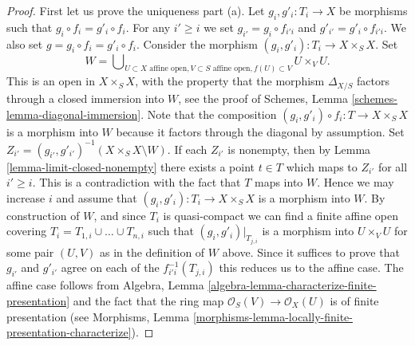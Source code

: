 \documentclass{stacks-project}
\theoremstyle{plain}
\theoremstyle{definition}
\theoremstyle{remark}
\numberwithin{equation}{subsection}
\begin{document}
\begin{proof}
\noindent
First let us prove the uniqueness part (a). Let $g_i, g'_i : T_i \to X$ be
morphisms such that $g_i \circ f_i = g'_i \circ f_i$. For any $i' \geq i$
we set $g_{i'} = g_i \circ f_{i'i}$ and $g'_{i'} = g'_i \circ f_{i'i}$.
We also set $g = g_i \circ f_i = g'_i \circ f_i$.
Consider the morphism
$(g_i, g'_i) : T_i \to X \times_S X$. Set
$$
W =
\bigcup\nolimits_{U \subset X\text{ affine open},
V \subset S\text{ affine open}, f(U) \subset V}
U \times_V U.
$$
This is an open in $X \times_S X$, with the property that the morphism
$\Delta_{X/S}$ factors through a closed immersion into $W$, see the proof
of Schemes, Lemma \ref{schemes-lemma-diagonal-immersion}.
Note that the composition
$(g_i, g'_i) \circ f_i : T \to X \times_S X$ is a morphism into $W$
because it factors through the diagonal by assumption.
Set $Z_{i'} = (g_{i'}, g'_{i'})^{-1}(X \times_S X \setminus W)$.
If each $Z_{i'}$ is nonempty, then by Lemma \ref{lemma-limit-closed-nonempty}
there exists a point $t \in T$ which maps to $Z_{i'}$ for all
$i' \geq i$. This is a contradiction with the fact that $T$ maps into $W$.
Hence we may increase $i$ and assume that $(g_i, g'_i) : T_i \to X \times_S X$
is a morphism into $W$. By construction of $W$, and since $T_i$ is
quasi-compact we can find a finite affine open covering
$T_i = T_{1, i} \cup \ldots \cup T_{n, i}$ such that
$(g_i, g'_i)|_{T_{j, i}}$ is a morphism into $U \times_V U$ for
some pair $(U, V)$ as in the definition of $W$ above.
Since it suffices to prove that $g_{i'}$ and $g'_{i'}$ agree
on each of the $f_{i'i}^{-1}(T_{j, i})$ this reduces us to the affine case.
The affine case follows from
Algebra, Lemma \ref{algebra-lemma-characterize-finite-presentation}
and the fact that the ring map
$\mathcal{O}_S(V) \to \mathcal{O}_X(U)$ is of finite presentation
(see Morphisms,
Lemma \ref{morphisms-lemma-locally-finite-presentation-characterize}).


\end{proof}
\end{document}
